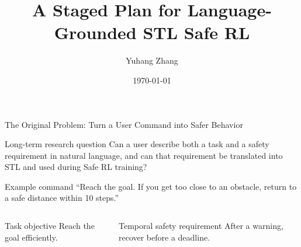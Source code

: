 \documentclass[aspectratio=169]{beamer}
\title[Language-Grounded STL Safe RL]{A Staged Plan for Language-Grounded STL Safe RL}
\author{Yuhang Zhang}
\institute{EECS, Washington State University}
\date{\today}
\begin{document}
\begin{frame}{The Original Problem: Turn a User Command into Safer Behavior}
\begin{block}{Long-term research question}
\large
Can a user describe both a task and a safety requirement in natural language, and can that requirement be translated into STL and used during Safe RL training?
\end{block}

\vspace{0.55em}
\begin{block}{Example command}
\large
``Reach the goal. If you get too close to an obstacle, return to a safe distance within 10 steps.''
\end{block}

\begin{columns}[T]
\begin{block}{Task objective}
\footnotesize
Reach the goal efficiently.
\end{block}
\begin{block}{Temporal safety requirement}
\footnotesize
After a warning, recover before a deadline.
\end{block}
\end{columns}
\end{frame}
\end{document}
